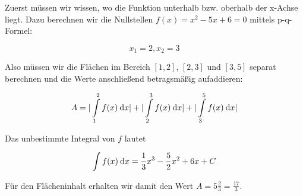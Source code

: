 \item

Zuerst müssen wir wissen, wo die Funktion unterhalb bzw. oberhalb der x-Achse liegt. Dazu berechnen wir die Nullstellen $f(x) = x^2-5x+6 = 0$ mittels p-q-Formel:

$$x_1 = 2, x_2 = 3$$

Also müssen wir die Flächen im Bereich $[1,2]$, $[2,3]$ und $[3,5]$ separat berechnen und die Werte anschließend betragsmäßig aufaddieren:

$$A = | \int\limits_1^2 f(x) \:\mathrm{d}{x} | + | \int\limits_2^3 f(x) \:\mathrm{d}{x} | + | \int\limits_3^5 f(x) \:\mathrm{d}{x} | $$

Das unbestimmte Integral von $f$ lautet

$${\int f(x) \:\mathrm{d}{x}} = \frac{1}{3} x^3 - \frac{5}{2} x^2 + 6x + C$$

Für den Flächeninhalt erhalten wir damit den Wert $A=5\frac{2}{3} = \frac{17}{3}$.

